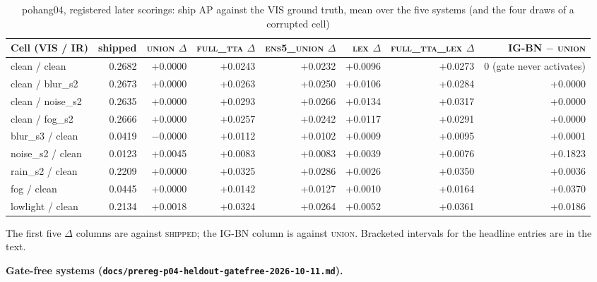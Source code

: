 \documentclass[journal,onecolumn]{IEEEtran}
\begin{document}
\begin{table}[htbp]
\centering
\footnotesize
\caption{pohang04, registered later scorings: ship AP against the VIS ground truth, mean over the five systems (and the four draws of a corrupted cell)}
\label{tab:17}
\setlength{\tabcolsep}{3pt}
\begin{adjustbox}{max width=\linewidth}
\begin{tabular}{lrrrrrrr}
\toprule
Cell (VIS / IR) & shipped & \textsc{union} $\Delta$ & \textsc{full\_tta} $\Delta$ & \textsc{ens5\_union} $\Delta$ & \textsc{lex} $\Delta$ & \textsc{full\_tta\_lex} $\Delta$ & \mbox{IG-BN} $-$ \textsc{union} \\
\midrule
clean / clean & 0.2682 & +0.0000 & +0.0243 & +0.0232 & +0.0096 & +0.0273 & 0 (gate never activates) \\
clean / blur\_s2 & 0.2673 & +0.0000 & +0.0263 & +0.0250 & +0.0106 & +0.0284 & +0.0000 \\
clean / noise\_s2 & 0.2635 & +0.0000 & +0.0293 & +0.0266 & +0.0134 & +0.0317 & +0.0000 \\
clean / fog\_s2 & 0.2666 & +0.0000 & +0.0257 & +0.0242 & +0.0117 & +0.0291 & +0.0000 \\
blur\_s3 / clean & 0.0419 & $-$0.0000 & +0.0112 & +0.0102 & +0.0009 & +0.0095 & +0.0001 \\
noise\_s2 / clean & 0.0123 & +0.0045 & +0.0083 & +0.0083 & +0.0039 & +0.0076 & +0.1823 \\
rain\_s2 / clean & 0.2209 & +0.0000 & +0.0325 & +0.0286 & +0.0026 & +0.0350 & +0.0036 \\
fog / clean & 0.0445 & +0.0000 & +0.0142 & +0.0127 & +0.0010 & +0.0164 & +0.0370 \\
lowlight / clean & 0.2134 & +0.0018 & +0.0324 & +0.0264 & +0.0052 & +0.0361 & +0.0186 \\
\bottomrule
\end{tabular}
\end{adjustbox}
\par\smallskip\raggedright\footnotesize The first five $\Delta$ columns are against \textsc{shipped}; the \mbox{IG-BN} column is against \textsc{union}. Bracketed intervals for the headline entries are in the text.
\end{table}
\textbf{Gate-free systems (\texttt{docs/\allowbreak{}prereg-\allowbreak{}p04-\allowbreak{}heldout-\allowbreak{}gatefree-\allowbreak{}2026-\allowbreak{}10-\allowbreak{}11.md}).}
\end{document}
